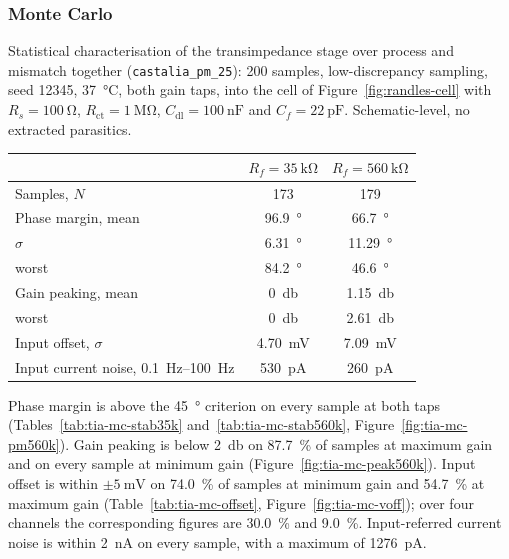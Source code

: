 
\subsubsection{Monte Carlo}\label{sss:tia-mc}

Statistical characterisation of the transimpedance stage over process and mismatch
together (\texttt{castalia\_pm\_25}): 200 samples, low-discrepancy sampling, seed 12345,
\SI{37}{\celsius}, both gain taps, into the cell of Figure~\ref{fig:randles-cell} with
$R_s = \SI{100}{\ohm}$, $R_{\mathrm{ct}} = \SI{1}{\mega\ohm}$,
$C_{\mathrm{dl}} = \SI{100}{\nano\farad}$ and $C_f = \SI{22}{\pico\farad}$.
Schematic-level, no extracted parasitics.

\begin{center}
\begin{tabular}{lcc}
\toprule
 & $R_f = \SI{35}{\kilo\ohm}$ & $R_f = \SI{560}{\kilo\ohm}$ \\
\midrule
Samples, $N$                                  & 173 & 179 \\
Phase margin, mean                            & \SI{96.9}{\degree}   & \SI{66.7}{\degree} \\
\quad $\sigma$                                & \SI{6.31}{\degree}   & \SI{11.29}{\degree} \\
\quad worst                                   & \SI{84.2}{\degree}   & \SI{46.6}{\degree} \\
Gain peaking, mean                            & \SI{0}{\decibel}     & \SI{1.15}{\decibel} \\
\quad worst                                   & \SI{0}{\decibel}     & \SI{2.61}{\decibel} \\
Input offset, $\sigma$                        & \SI{4.70}{\milli\volt} & \SI{7.09}{\milli\volt} \\
Input current noise, \SIrange{0.1}{100}{\hertz} & \SI{530}{\pico\ampere} & \SI{260}{\pico\ampere} \\
\bottomrule
\end{tabular}
\end{center}

Phase margin is above the \SI{45}{\degree} criterion on every sample at both taps
(Tables~\ref{tab:tia-mc-stab35k} and~\ref{tab:tia-mc-stab560k},
Figure~\ref{fig:tia-mc-pm560k}). Gain peaking is below \SI{2}{\decibel} on
\SI{87.7}{\percent} of samples at maximum gain and on every sample at minimum gain
(Figure~\ref{fig:tia-mc-peak560k}). Input offset is within \(\pm\SI{5}{\milli\volt}\) on
\SI{74.0}{\percent} of samples at minimum gain and \SI{54.7}{\percent} at maximum gain
(Table~\ref{tab:tia-mc-offset}, Figure~\ref{fig:tia-mc-voff}); over four channels the
corresponding figures are \SI{30.0}{\percent} and \SI{9.0}{\percent}. Input-referred
current noise is within \SI{2}{\nano\ampere} on every sample, with a maximum of
\SI{1276}{\pico\ampere}.

